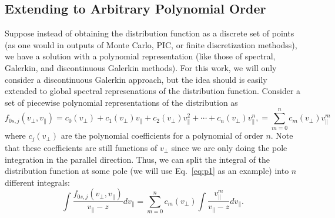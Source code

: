 

\subsection{Extending to Arbitrary Polynomial Order}

Suppose instead of obtaining the distribution function as a discrete set of points (as one would in outputs of Monte Carlo, PIC, or finite discretization methodss), we have a solution with a polynomial representation (like those of spectral, Galerkin, and discontinuous Galerkin methods). 
For this work, we will only consider a discontinuous Galerkin approach, but the idea should is easily extended to global spectral represenations of the distribution function.
Consider a set of piecewise polynomial representations of the distribution as
\begin{equation}
	f_{0s,j}(v_\perp, v_\parallel) = c_0(v_\perp) + c_1(v_\perp) v_\parallel + c_2(v_\perp) v_\parallel^2 + \cdots + c_n(v_\perp) v_\parallel^n,
	= \sum_{m=0}^n c_m(v_\perp) v_\parallel^m
	\label{eq:arb_poly_dist} 
\end{equation}
where $c_j(v_\perp)$ are the polynomial coefficients for a polynomial of order $n$. 
Note that these coefficients are still functions of $v_\perp$ since we are only doing the pole integration in the parallel direction.
Thus, we can split the integral of the distribution function at some pole (we will use Eq.~\ref{eq:p1} as an example) into $n$ different integrals:
\begin{equation}
	\int \frac{f_{0s,j}(v_\perp, v_\parallel)}{v_\parallel -z} dv_\parallel = 
	\sum_{m=0}^n c_m(v_\perp)\int \frac{v_\parallel^m}{v_\parallel -z} dv_\parallel.
\end{equation}
 
